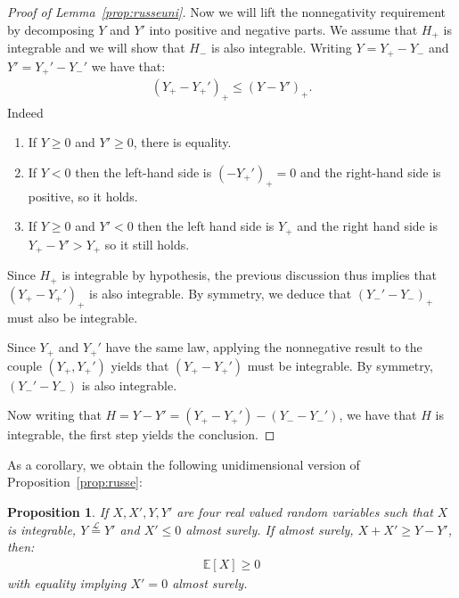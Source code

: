 \documentclass[11pt]{article}
\newtheorem{prop}{Proposition}[section]
\begin{document}
\begin{proof}[Proof of Lemma~\ref{prop:russeuni}]
Now we will lift the nonnegativity requirement by decomposing $Y$ and $Y'$ into positive and negative parts. We assume that $H_+$ is integrable and we will show that $H_-$ is also integrable.
Writing $Y=Y_+-Y_-$ and $Y'=Y_+'-Y_-'$ we have that:
\begin{align*}
    (Y_+-Y_+')_+ \leq (Y-Y')_+.
\end{align*}
Indeed 
\begin{enumerate}
\item If $Y\geq 0$ and $Y' \geq 0$, there is equality.
\item If $Y <0$ then the left-hand side is $(-Y_+')_+=0$ and the right-hand side is positive, so it holds.
\item If $Y\geq 0$ and $Y'<0$ then the left hand side is $Y_+$ and the right hand side is $Y_+-Y'>Y_+$ so it still holds.
\end{enumerate}
Since $H_+$ is integrable by hypothesis, the previous discussion thus implies that $(Y_+-Y_+')_+$ is also integrable.
By symmetry, we deduce that $(Y_-'-Y_-)_+$ must also be integrable.

Since $Y_+$ and $Y_+'$ have the same law, applying the nonnegative result to the couple $(Y_+,Y_+')$ yields that $(Y_+-Y_+')$ must be integrable.
By symmetry, $(Y_-'-Y_-)$ is also integrable.

Now writing that $H=Y-Y'=(Y_+-Y_+')-(Y_--Y_-')$, we have that $H$ is integrable, the first step yields the conclusion.
\end{proof}
As a corollary, we obtain the following unidimensional version of Proposition~\ref{prop:russe}:
\begin{prop}\label{coro:russeuni}
    If $X,X',Y,Y'$ are four real valued random variables such that $X$ is integrable, $Y\overset{\mathcal{L}}{=}Y'$ and $X' \leq 0$ almost surely.
    If almost surely, $X+X'\geq Y-Y'$, then:
    \begin{align*}
        \mathbb{E}[X]\geq 0
    \end{align*}
    with equality implying $X'=0$ almost surely.
\end{prop}
\end{document}
